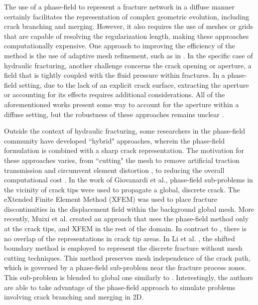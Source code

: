     The use of a phase-field to represent a fracture network in a diffuse manner certainly facilitates the representation of complex geometric evolution, including crack branching and merging. However, it also requires the use of meshes or grids that are capable of resolving the regularization length, making these approaches computationally expensive. One approach to improving the efficiency of the method is the use of adaptive mesh refinement, such as in \cite{heister2015primal, lee2017iterative, Wick-adaptive-2020,Gupta-adaptive-2022}. In the specific case of hydraulic fracturing, another challenge concerns the crack opening or aperture, a field that is tightly coupled with the fluid pressure within fractures. In a phase-field setting, due to the lack of an explicit crack surface, extracting the aperture or accounting for its effects requires additional considerations.  All of the aforementioned  works present some way to account for the aperture within a diffuse setting, but the robustness of these approaches remains unclear \cite{lecampion2018numerical}. 

    Outside the context of hydraulic fracturing, some researchers in the phase-field community have developed ``hybrid" approaches, wherein the phase-field formulation is combined with a sharp crack representation. The motivation for these approaches varies, from ``cutting" the mesh to remove artificial traction transmission and circumvent element distortion \cite{geelen2018optimization}, to reducing the overall computational cost \cite{giovanardi2017hybrid, muixi2021combined,li2023blended}. In the work of Giovanardi et al.\cite{giovanardi2017hybrid}, phase-field sub-problems in the vicinity of  crack tips were used to propagate a global, discrete crack. The eXtended Finite Element Method (XFEM)\cite{moes1999finite} was used to place fracture discontinuities in the displacement field within the background global mesh. More recently, Muixi et al.\cite{muixi2021combined} created an approach that uses the phase-field method only at the crack tips, and XFEM in the rest of the domain. In contrast to \cite{giovanardi2017hybrid}, there is no overlap of the representations in crack tip areas. In Li et al. \cite{li2023blended}, the shifted boundary method is employed to represent the discrete fracture without mesh cutting techniques. This method preserves mesh independence of the crack path, which is governed by a phase-field sub-problem near the fracture process zones. This sub-problem is blended to global one similarly to \cite{giovanardi2017hybrid}. Interestingly, the authors are able to take advantage of the phase-field approach to simulate problems involving crack branching and merging in 2D.


